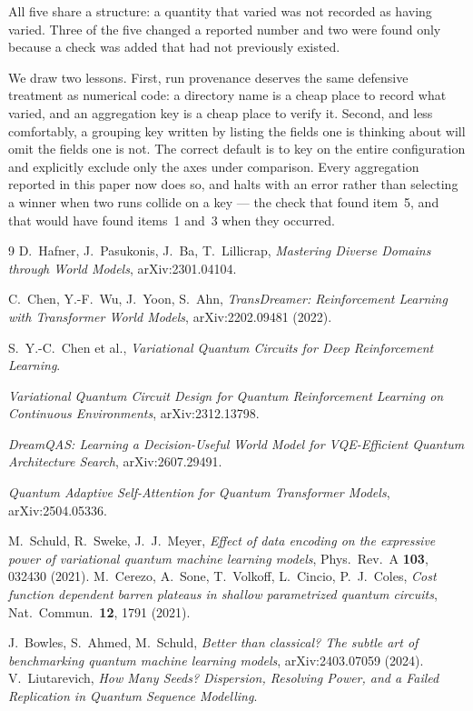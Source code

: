 \documentclass[11pt,onecolumn]{article}
\newif\ifdraft
\newcommand{\pend}[1]{%
  \ifdraft\textcolor{PendFG}{\textbf{[}\textit{#1}\textbf{]}}\fi}
\begin{document}
All five share a structure: a quantity that varied was not
recorded as having varied. Three of the five changed a reported
number and two were found only because a check was added that had not
previously existed.

We draw two lessons. First, run provenance deserves the same defensive
treatment as numerical code: a directory name is a cheap place to
record what varied, and an aggregation key is a cheap place to verify
it. Second, and less comfortably, a grouping key written by listing the
fields one is thinking about will omit the fields one is not. The
correct default is to key on the entire configuration and explicitly
exclude only the axes under comparison. Every aggregation reported in
this paper now does so, and halts with an error rather than selecting a
winner when two runs collide on a key --- the check that found item~5,
and that would have found items~1 and~3 when they occurred.


\begin{thebibliography}{9}
 D.~Hafner, J.~Pasukonis, J.~Ba, T.~Lillicrap,
  \emph{Mastering Diverse Domains through World Models},
  arXiv:2301.04104. \pend{venue of record}
 C.~Chen, Y.-F.~Wu, J.~Yoon, S.~Ahn,
  \emph{TransDreamer: Reinforcement Learning with Transformer World
  Models}, arXiv:2202.09481 (2022). \pend{verify author list}
 S.~Y.-C.~Chen et al., \emph{Variational Quantum
  Circuits for Deep Reinforcement Learning}. \pend{full citation}
 \emph{Variational Quantum Circuit Design for
  Quantum Reinforcement Learning on Continuous Environments},
  arXiv:2312.13798. \pend{verify authors}
 \emph{DreamQAS: Learning a Decision-Useful World
  Model for VQE-Efficient Quantum Architecture Search},
  arXiv:2607.29491. \pend{verify authors}
 \emph{Quantum Adaptive Self-Attention for Quantum
  Transformer Models}, arXiv:2504.05336. \pend{verify authors; cite the
  revised version}
 M.~Schuld, R.~Sweke, J.~J.~Meyer, \emph{Effect of
  data encoding on the expressive power of variational quantum machine
  learning models}, Phys.\ Rev.\ A \textbf{103}, 032430 (2021).
 M.~Cerezo, A.~Sone, T.~Volkoff, L.~Cincio,
  P.~J.~Coles, \emph{Cost function dependent barren plateaus in shallow
  parametrized quantum circuits}, Nat.\ Commun.\ \textbf{12}, 1791
  (2021). \pend{verify}
 J.~Bowles, S.~Ahmed, M.~Schuld, \emph{Better than
  classical? The subtle art of benchmarking quantum machine learning
  models}, arXiv:2403.07059 (2024).
 V.~Liutarevich, \emph{How Many Seeds? Dispersion,
  Resolving Power, and a Failed Replication in Quantum Sequence
  Modelling}. \pend{companion paper}
\end{thebibliography}
\end{document}

